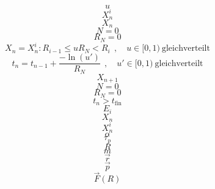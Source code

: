 \documentclass{scrreprt}
\begin{document}
\begin{equation}
u
\end{equation}
\begin{equation}
X_n^i
\end{equation}
\begin{equation}
X_n
\end{equation}
\begin{equation}
N = 0
\end{equation}
\begin{equation}
R_N = 0
\end{equation}
\begin{equation}
  X_n = X_n^i : R_{i-1} \le u R_N < R_i ~~,\quad u \in [0,1)~\text{gleichverteilt}
\end{equation}
\begin{equation}
  t_n = t_{n-1} + \frac{-\ln(u')}{R_N} ~~,\quad u' \in [0,1)~\text{gleichverteilt}
\end{equation}
\begin{equation}
X_{n+1}
\end{equation}
\begin{equation}
N=0
\end{equation}
\begin{equation}
R_N=0
\end{equation}
\begin{equation}
t_n > t_\text{fin}
\end{equation}
\begin{equation}
E_i
\end{equation}
\begin{equation}
X_n
\end{equation}
\begin{equation}
X_n^i
\end{equation}
\begin{equation}
\alpha
\end{equation}
\begin{equation}
\tau_p
\end{equation}
\begin{equation}
R
\end{equation}
\begin{equation}
m
\end{equation}
\begin{equation}
\vec r
\end{equation}
\begin{equation}
\vec p
\end{equation}
\begin{equation}
\vec{F}(R)
\end{equation}
\end{document}
